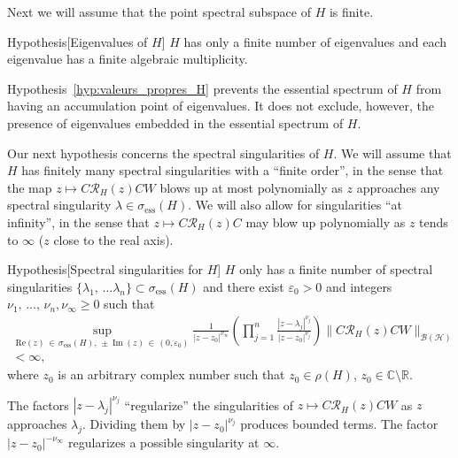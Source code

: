 \documentclass[10pt]{amsart}
\theoremstyle{definition}\newtheorem{defi}[theo]{Definition}\newtheorem{rema}[theo]{Remark}\newtheorem{exam}[theo]{Example}\newtheorem{exem}[theo]{Example}\newtheorem{nota}[theo]{Notation}
\newcommand{\Hi}{\mathcal{H}}
\newcommand{\bbC}{\mathbb{C}}
\newcommand{\R}{\mathbb{R}}
\newcommand{\ess}{\mathrm{ess}}
\newcommand{\Res}{\mathcal{R}}
\newcommand{\clB}{\mathcal{B}}
\DeclareMathOperator{\im}{Im}
\begin{document}
Next we will assume that the point spectral subspace of $H$ is finite.

\begin{enonce}
{Hypothesis}[Eigenvalues of $H$]\label{hyp:valeurs_propres_H}
$H$ has only a finite number of eigenvalues and each eigenvalue has a finite algebraic multiplicity.
\end{enonce}

Hypothesis~\ref{hyp:valeurs_propres_H} prevents the essential spectrum of $H$ from having an accumulation point of eigenvalues. It does not exclude, however, the presence of eigenvalues embedded in the essential spectrum of $H$.



Our next hypothesis concerns the spectral singularities of $H$. We will assume that $H$ has finitely many spectral singularities with a ``finite order'', in the sense that the map $z\mapsto C\Res_H(z)CW$ blows up at most polynomially as $z$ approaches any spectral singularity $\lambda\in\sigma_{\ess}(H)$. We will also allow for singularities ``at infinity'', in the sense that $z\mapsto C\Res_H(z)C$ may blow up polynomially as $z$ tends to $\infty$ ($z$ close to the real axis).

\begin{enonce}
{Hypothesis}[Spectral singularities for $H$]\label{hyp:singularités_spectrales}
$H$ only has a finite number of spectral singularities $\lbrace \lambda_1,\,\ldots\lambda_n\rbrace\subset \sigma_{\ess}(H)$ and there exist $\varepsilon_0>0$ and integers $\nu_1,\,\dots,\,\nu_n,\nu_\infty\ge0$ such that
\begin{multline}\label{eq:limit_uniform}
\sup_{\mathrm{Re}(z)\,\in\,\sigma_{\ess}(H),\,\pm\im(z)\,\in\,(0,\varepsilon_0)} \frac{1}{|z-z_0|^{\nu_\infty}} \left(\prod_{j=1}^n\frac{ |z-\lambda_j|^{\nu_j} }{ |z-z_0|^{\nu_j} } \right) \big\|C\Res_H(z)CW\big\|_{\clB(\Hi)}\\
<\infty,
\end{multline}
where $z_0$ is an arbitrary complex number such that $z_0\in\rho(H)$, $z_0\in\bbC\setminus\R$.
\end{enonce}

The factors $|z-\lambda_j|^{\nu_j}$ ``regularize'' the singularities of $z\mapsto C\Res_H(z)CW$ as $z$ approaches $\lambda_j$. Dividing them by $|z-z_0|^{\nu_j}$ produces bounded terms. The factor $|z-z_0|^{-\nu_\infty}$ regularizes a possible singularity at $\infty$.
\end{document}
